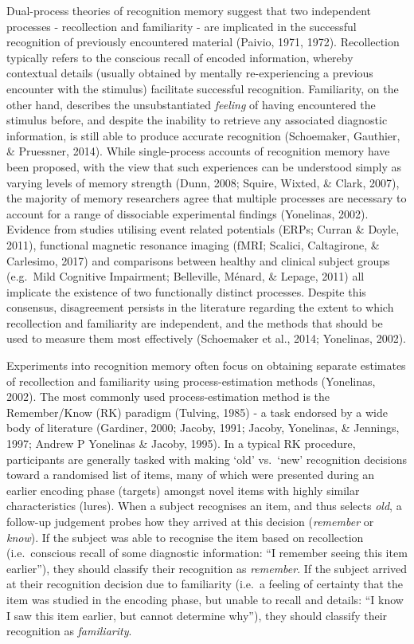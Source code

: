 \documentclass[
  11pt,
]{article}
\begin{document}
Dual-process theories of recognition memory suggest that two independent
processes - recollection and familiarity - are implicated in the
successful recognition of previously encountered material (Paivio, 1971,
1972). Recollection typically refers to the conscious recall of encoded
information, whereby contextual details (usually obtained by mentally
re-experiencing a previous encounter with the stimulus) facilitate
successful recognition. Familiarity, on the other hand, describes the
unsubstantiated \emph{feeling} of having encountered the stimulus
before, and despite the inability to retrieve any associated diagnostic
information, is still able to produce accurate recognition (Schoemaker,
Gauthier, \& Pruessner, 2014). While single-process accounts of
recognition memory have been proposed, with the view that such
experiences can be understood simply as varying levels of memory
strength (Dunn, 2008; Squire, Wixted, \& Clark, 2007), the majority of
memory researchers agree that multiple processes are necessary to
account for a range of dissociable experimental findings (Yonelinas,
2002). Evidence from studies utilising event related potentials (ERPs;
Curran \& Doyle, 2011), functional magnetic resonance imaging (fMRI;
Scalici, Caltagirone, \& Carlesimo, 2017) and comparisons between
healthy and clinical subject groups (e.g.~Mild Cognitive Impairment;
Belleville, Ménard, \& Lepage, 2011) all implicate the existence of two
functionally distinct processes. Despite this consensus, disagreement
persists in the literature regarding the extent to which recollection
and familiarity are independent, and the methods that should be used to
measure them most effectively (Schoemaker et al., 2014; Yonelinas,
2002).

Experiments into recognition memory often focus on obtaining separate
estimates of recollection and familiarity using process-estimation
methods (Yonelinas, 2002). The most commonly used process-estimation
method is the Remember/Know (RK) paradigm (Tulving, 1985) - a task
endorsed by a wide body of literature (Gardiner, 2000; Jacoby, 1991;
Jacoby, Yonelinas, \& Jennings, 1997; Andrew P Yonelinas \& Jacoby,
1995). In a typical RK procedure, participants are generally tasked with
making `old' vs.~`new' recognition decisions toward a randomised list of
items, many of which were presented during an earlier encoding phase
(targets) amongst novel items with highly similar characteristics
(lures). When a subject recognises an item, and thus selects \emph{old},
a follow-up judgement probes how they arrived at this decision
(\emph{remember} or \emph{know}). If the subject was able to recognise
the item based on recollection (i.e.~conscious recall of some diagnostic
information: ``I remember seeing this item earlier''), they should
classify their recognition as \emph{remember}. If the subject arrived at
their recognition decision due to familiarity (i.e.~a feeling of
certainty that the item was studied in the encoding phase, but unable to
recall and details: ``I know I saw this item earlier, but cannot
determine why''), they should classify their recognition as
\emph{familiarity}.
\end{document}
